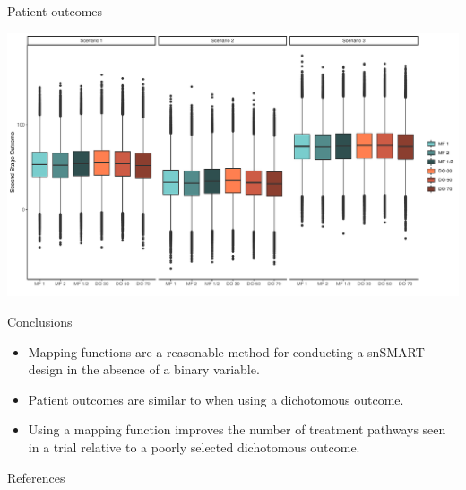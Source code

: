 \documentclass[pdftex]{beamer}
\begin{document}
\begin{frame}{Patient outcomes}
\begin{center}
\includegraphics[scale=.4]{outFinalColor.pdf}
\end{center}
\end{frame}

\begin{frame}{Conclusions}
\begin{itemize}
\item Mapping functions are a reasonable method for conducting a snSMART design in the absence of a binary variable.
\item Patient outcomes are similar to when using a dichotomous outcome.
\item Using a mapping function improves the number of treatment pathways seen in a trial relative to a poorly selected dichotomous outcome. 
\end{itemize}
\end{frame}


\begin{frame}{References}
\AtNextBibliography{\footnotesize}
\printbibliography

\end{frame}

%
\end{document}
